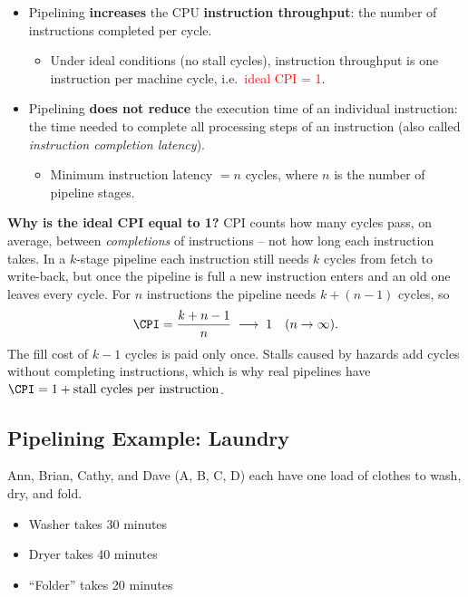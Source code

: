 \begin{itemize}
  \item Pipelining \textbf{increases} the CPU \textbf{instruction throughput}:
  the number of instructions completed per cycle.
  \begin{itemize}
    \item Under ideal conditions (no stall cycles), instruction throughput is
    one instruction per machine cycle, i.e.\ \textcolor{red}{ideal CPI = 1}.
  \end{itemize}
  \item Pipelining \textbf{does not reduce} the execution time of an
  individual instruction: the time needed to complete all processing steps of
  an instruction (also called \emph{instruction completion latency}).
  \begin{itemize}
    \item Minimum instruction latency $= n$ cycles, where $n$ is the number of
    pipeline stages.
  \end{itemize}
\end{itemize}

\begin{explanation}
\textbf{Why is the ideal CPI equal to 1?} CPI counts how many cycles pass, on
average, between \emph{completions} of instructions -- not how long each
instruction takes. In a $k$-stage pipeline each instruction still needs $k$
cycles from fetch to write-back, but once the pipeline is full a new
instruction enters and an old one leaves every cycle. For $n$ instructions the
pipeline needs $k + (n-1)$ cycles, so
\[
  \CPI = \frac{k + n - 1}{n} \;\longrightarrow\; 1 \quad (n\to\infty).
\]
The fill cost of $k-1$ cycles is paid only once. Stalls caused by hazards add
cycles without completing instructions, which is why real pipelines have
$\CPI = 1 + \text{stall cycles per instruction}$.
\end{explanation}

\subsection{Pipelining Example: Laundry}

\begin{eg}
Ann, Brian, Cathy, and Dave (A, B, C, D) each have one load of clothes to
wash, dry, and fold.
\begin{itemize}
  \item Washer takes 30 minutes
  \item Dryer takes 40 minutes
  \item ``Folder'' takes 20 minutes
\end{itemize}
\end{eg}

